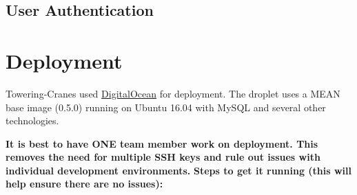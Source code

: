 \documentclass{article}
\begin{document}
\subsection{User Authentication}

\section{Deployment}
Towering-Cranes used \href{http://www.digitalocean.com/}{DigitalOcean} for deployment. The droplet uses a MEAN base image (0.5.0) running on Ubuntu 16.04 with MySQL and several other technologies.

\textbf{It is best to have ONE team member work on deployment. This removes the need for multiple SSH keys and rule out issues with individual development environments.}
\textbf{Steps to get it running (this will help ensure there are no issues):}
\end{document}
